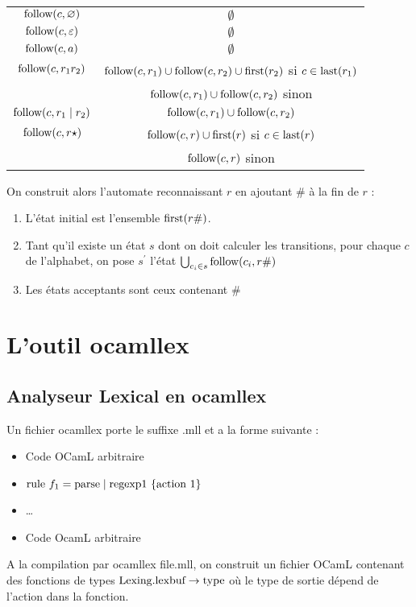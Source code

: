 \documentclass{cours}
\begin{document}
\begin{center}
\begin{tabular}{c@{ = }c}
        \midrule
        $\textmd{follow}(c, \emptyset)$ & $\emptyset$\\
        $\textmd{follow}(c, \epsilon)$ & $\emptyset$\\
        $\textmd{follow}(c, a)$ & $\emptyset$\\
        $\textmd{follow}(c, r_{1}r_{2})$ & $\textmd{follow}(c, r_{1}) \cup \textmd{follow}(c, r_{2}) \cup \textmd{first}(r_{2})$ si $c \in \textmd{last}(r_{1})$\\
        & $\textmd{follow}(c, r_{1}) \cup \textmd{follow}(c, r_{2})$ sinon\\
        $\textmd{follow}(c, r_{1} \mid r_{2})$ & $\textmd{follow}(c, r_{1}) \cup \textmd{follow}(c, r_{2})$\\
        $\textmd{follow}(c, r\star)$ & $\textmd{follow}(c, r) \cup \textmd{first}(r)$ si $c\in \textmd{last}(r)$\\
        &$\textmd{follow}(c, r)$ sinon\\
        \bottomrule
    \end{tabular}
\end{center}
On construit alors l'automate reconnaissant $r$ en ajoutant $\#$ à la fin de $r$ : 
\begin{enumerate}
    \item L'état initial est l'ensemble $\textmd{first}(r\#)$.
    \item Tant qu'il existe un état $s$ dont on doit calculer les transitions, pour chaque $c$ de l'alphabet, on pose $s^{'}$ l'état $\bigcup_{c_{i} \in s} \textmd{follow}(c_{i}, r\#)$
    \item Les états acceptants sont ceux contenant $\#$
\end{enumerate}

\section{L'outil \textmd{ocamllex}}
\subsection{Analyseur Lexical en \textmd{ocamllex}}
Un fichier \textmd{ocamllex} porte le suffixe \textmd{.mll} et a la forme suivante : 
\begin{itemize}
    \item Code OCamL arbitraire
    \item $\textmd{rule } f_{1} = \textmd{parse} \mid \textmd{regexp1 } \{\textmd{action 1}\}$ 
    \item \dots
    \item Code OcamL arbitraire
\end{itemize}
A la compilation par \textmd{ocamllex file.mll}, on construit un fichier OCamL contenant des fonctions de types $\textmd{Lexing.lexbuf} \rightarrow \textmd{type}$ où le type de sortie dépend de l'action dans la fonction. \\
\end{document}
